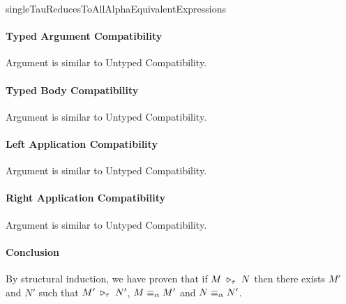 \begin{longproof}{singleTauReducesToAllAlphaEquivalentExpressions}
\paragraph{Typed Argument Compatibility}
Argument is similar to Untyped Compatibility.

\paragraph{Typed Body Compatibility}
Argument is similar to Untyped Compatibility.

\paragraph{Left Application Compatibility}
Argument is similar to Untyped Compatibility.

\paragraph{Right Application Compatibility}
Argument is similar to Untyped Compatibility.

\paragraph{Conclusion}
By structural induction, we have proven that if $M \;\triangleright_\tau\; N$ then there exists $M'$ and $N'$ such that $M' \;\triangleright_\tau\; N'$, $M \equiv_\alpha M'$ and $N \equiv_\alpha N'$.

\end{longproof}


